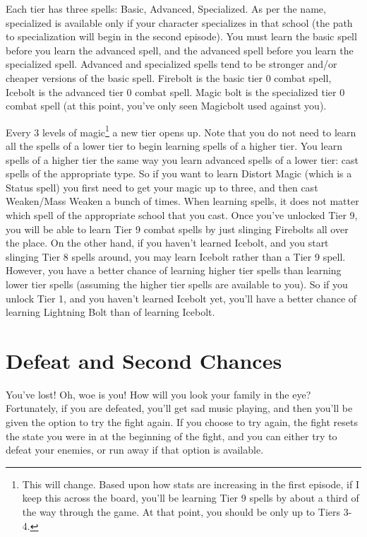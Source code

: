 \documentclass{report}
\begin{document}
Each tier has three spells: Basic, Advanced, Specialized. As per the name, specialized is available only if your character specializes in that school (the path to specialization will begin in the second episode). You must learn the basic spell before you learn the advanced spell, and the advanced spell before you learn the specialized spell. Advanced and specialized spells tend to be stronger and/or cheaper versions of the basic spell. Firebolt is the basic tier 0 combat spell, Icebolt is the advanced tier 0 combat spell. Magic bolt is the specialized tier 0 combat spell (at this point, you've only seen Magicbolt used against you).


Every 3 levels of magic\footnote{This will change. Based upon how stats are increasing in the first episode, if I keep this across the board, you'll be learning Tier 9 spells by about a third of the way through the game. At that point, you should be only up to Tiers 3-4.} 
a new tier opens up. Note that you do not need to learn all the spells of a lower tier to begin learning spells of a higher tier. You learn spells of a higher tier the same way you learn advanced spells of a lower tier: cast spells of the appropriate type. So if you want to learn Distort Magic (which is a Status spell) you first need to get your magic up to three, and then cast Weaken/Mass Weaken a bunch of times.  
When learning spells, it does not matter which spell of the appropriate school that you cast. Once you've unlocked Tier 9, you will be able to learn Tier 9 combat spells by just slinging Firebolts all over the place. On the other hand, if you haven't learned Icebolt, and you start slinging Tier 8 spells around, you may learn Icebolt rather than a Tier 9 spell. However, you have a better chance of learning higher tier spells than learning lower tier spells (assuming the higher tier spells are available to you). So if you unlock Tier 1, and you haven't learned Icebolt yet, you'll have a better chance of learning Lightning Bolt than of learning Icebolt.

\section{Defeat and Second Chances}

You've lost! Oh, woe is you! How will you look your family in the eye? 
Fortunately, if you are defeated, you'll get sad music playing, and then you'll
be given the option to try the fight again. If you choose to try again, the fight
resets the state you were in at the beginning of the fight, and you can either
try to defeat your enemies, or run away if that option is available.
\end{document}

